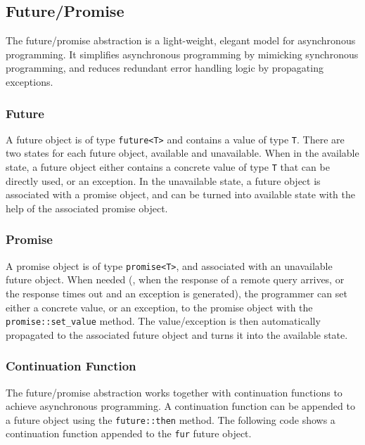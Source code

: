 

\subsection{Future/Promise}
\label{sec:intro-future-promise}

The future/promise abstraction is a light-weight, elegant model for asynchronous programming. It simplifies asynchronous programming by mimicking synchronous programming, and reduces redundant error handling logic by propagating exceptions.


\subsubsection{Future}
A future object is of type \lstinline[style=InlineStyle]{future<T>} and contains a value of type \lstinline[style=InlineStyle]{T}. %
There are two states for each future object, available and unavailable. When in the available state, a future object either contains a concrete value of type \lstinline[style=InlineStyle]{T} that can be directly used, or an exception. In the unavailable state, a future object is associated with a promise object, and can be turned into available state with the help of the associated promise object.

\subsubsection{Promise}
A promise object is of type \lstinline[style=InlineStyle]{promise<T>}, and associated with an unavailable future object. When needed (\eg, when the response of a remote query arrives, or the response times out and an exception is generated), the programmer can set either a concrete value, or an exception, to the promise object with the \lstinline[style=InlineStyle]{promise::set_value} method. The value/exception is then automatically propagated to the associated future object and turns it into the available state.

\subsubsection{Continuation Function}
The future/promise abstraction works together with continuation functions to achieve asynchronous programming. A continuation function can be appended to a future object using the \lstinline[style=InlineStyle]{future::then} method. The following code shows a continuation function appended to the \lstinline[style=InlineStyle]{fur} future object.

